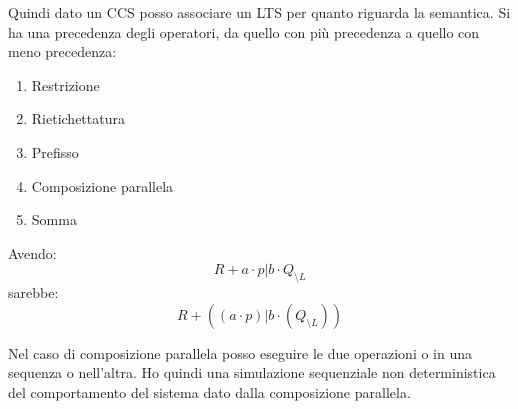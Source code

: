 Quindi dato un CCS posso associare un LTS per quanto riguarda la semantica. Si
ha una precedenza degli operatori, da quello con più precedenza a quello con meno precedenza:
\begin{enumerate}
    \item Restrizione
    \item Rietichettatura
    \item Prefisso
    \item Composizione parallela
    \item Somma
\end{enumerate}
\begin{esempio} 
    Avendo: $$R + a \cdot p | b \cdot Q_{\setminus L}$$ sarebbe: $$R + ((a \cdot p) | b \cdot (Q_{\setminus L}))$$
\end{esempio}
Nel caso di composizione parallela posso eseguire le due operazioni o in una
sequenza o nell'altra. Ho quindi una simulazione sequenziale non deterministica
del comportamento del sistema dato dalla composizione parallela.

